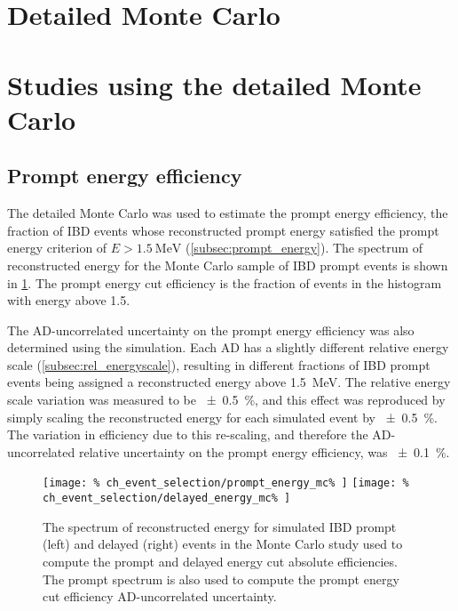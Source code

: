 \section{Detailed Monte Carlo}
\label{sec:thu_toymc}

\section{Studies using the detailed Monte Carlo}
\label{sec:thu_toymc_studies}

\subsection{Prompt energy efficiency}
\label{subsec:thu_toymc_prompt}

The detailed Monte Carlo was used to estimate the prompt energy efficiency,
the fraction of IBD events whose reconstructed prompt energy
satisfied the prompt energy criterion of $E > \SI{1.5}{\MeV}$
(\cref{subsec:prompt_energy}).
The spectrum of reconstructed energy for the Monte Carlo sample of IBD prompt events
is shown in \cref{fig:prompt_eff_mc}.
The prompt energy cut efficiency is the fraction of events in the histogram
with energy above \SI{1.5}{\mev}.

The AD-uncorrelated uncertainty on the prompt energy efficiency
was also determined using the simulation.
Each AD has a slightly different relative energy scale (\cref{subsec:rel_energyscale}),
resulting in different fractions of IBD prompt events
being assigned a reconstructed energy above \SI{1.5}{\MeV}.
The relative energy scale variation was measured to be \SI{+-0.5}{\percent},
and this effect was reproduced by simply
scaling the reconstructed energy for each simulated event by \SI{+-0.5}{\percent}.
The variation in efficiency due to this re-scaling,
and therefore the AD-uncorrelated relative uncertainty on the prompt energy efficiency,
was \SI{+-0.1}{\percent}.

\begin{figure}
    \centering
    \texttt{[image: \%
        ch\_event\_selection/prompt\_energy\_mc\%
    ]}
    \texttt{[image: \%
        ch\_event\_selection/delayed\_energy\_mc\%
    ]}
    \caption{The spectrum of reconstructed energy for simulated IBD prompt (left)
        and delayed (right) events
        in the Monte Carlo study used to compute the prompt and delayed
        energy cut absolute efficiencies.
        The prompt spectrum is also used to compute the prompt energy cut
    efficiency AD-uncorrelated uncertainty.}
    \label{fig:prompt_eff_mc}
\end{figure}
